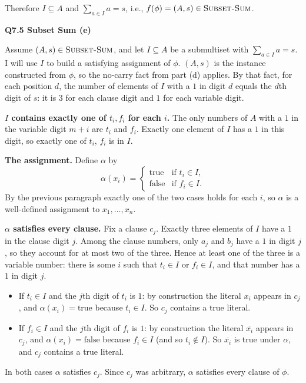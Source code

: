\documentclass[11pt]{article}
\newcommand{\cproblem}[1]{\textsc{#1}}
\newcommand{\SSUM}{\cproblem{Subset-Sum}}
\newcommand{\qpage}[1]{\clearpage\noindent\textbf{\large #1}\par\medskip}
\begin{document}
Therefore $I \subseteq A$ and $\sum_{a \in I} a = s$, i.e., $f(\phi) = (A, s) \in \SSUM$.

\qpage{Q7.5 Subset Sum (e)}

Assume $(A, s) \in \SSUM$, and let $I \subseteq A$ be a submultiset with $\sum_{a \in I} a = s$.
I will use $I$ to build a satisfying assignment of $\phi$.
$(A, s)$ is the instance constructed from $\phi$, so the no-carry fact from part (d) applies.
By that fact, for each position $d$, the number of elements of $I$ with a $1$ in digit $d$ equals the $d$th digit of $s$: it is $3$ for each clause digit and $1$ for each variable digit.

\textbf{$I$ contains exactly one of $t_i, f_i$ for each $i$.}
The only numbers of $A$ with a $1$ in the variable digit $m + i$ are $t_i$ and $f_i$.
Exactly one element of $I$ has a $1$ in this digit, so exactly one of $t_i$, $f_i$ is in $I$.

\textbf{The assignment.}
Define $\alpha$ by
\[
  \alpha(x_i) = \begin{cases} \text{true} & \text{if } t_i \in I, \\ \text{false} & \text{if } f_i \in I. \end{cases}
\]
By the previous paragraph exactly one of the two cases holds for each $i$, so $\alpha$ is a well-defined assignment to $x_1, \ldots, x_n$.

\textbf{$\alpha$ satisfies every clause.}
Fix a clause $c_j$.
Exactly three elements of $I$ have a $1$ in the clause digit $j$.
Among the clause numbers, only $a_j$ and $b_j$ have a $1$ in digit $j$, so they account for at most two of the three.
Hence at least one of the three is a variable number: there is some $i$ such that $t_i \in I$ or $f_i \in I$, and that number has a $1$ in digit $j$.
\begin{itemize}
  \item If $t_i \in I$ and the $j$th digit of $t_i$ is $1$: by construction the literal $x_i$ appears in $c_j$, and $\alpha(x_i) = \text{true}$ because $t_i \in I$.
  So $c_j$ contains a true literal.
  \item If $f_i \in I$ and the $j$th digit of $f_i$ is $1$: by construction the literal $\overline{x_i}$ appears in $c_j$, and $\alpha(x_i) = \text{false}$ because $f_i \in I$ (and so $t_i \notin I$).
  So $\overline{x_i}$ is true under $\alpha$, and $c_j$ contains a true literal.
\end{itemize}
In both cases $\alpha$ satisfies $c_j$.
Since $c_j$ was arbitrary, $\alpha$ satisfies every clause of $\phi$.
\end{document}
